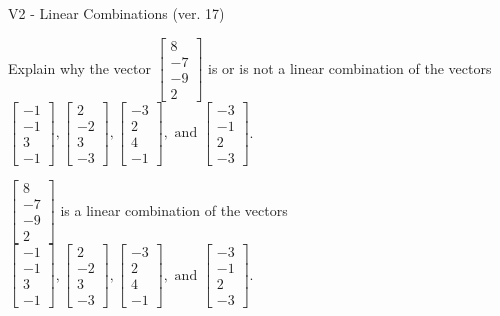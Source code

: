 \begin{exercise}
  \begin{exerciseTitle}V2 - Linear Combinations (ver. 17)\end{exerciseTitle}
  \begin{exerciseStatement}
    Explain why the vector \(\left[\begin{array}{c}
8 \\
-7 \\
-9 \\
2
\end{array}\right]\)  is or is not a linear 
	combination of the vectors \(\left[\begin{array}{c}
-1 \\
-1 \\
3 \\
-1
\end{array}\right] , \left[\begin{array}{c}
2 \\
-2 \\
3 \\
-3
\end{array}\right] , \left[\begin{array}{c}
-3 \\
2 \\
4 \\
-1
\end{array}\right] , \text{ and } \left[\begin{array}{c}
-3 \\
-1 \\
2 \\
-3
\end{array}\right]\).
	


  \end{exerciseStatement}
  \begin{exerciseAnswer}
   \(\left[\begin{array}{c}
8 \\
-7 \\
-9 \\
2
\end{array}\right]\) 
  	 is  
	a linear combination of the vectors \(\left[\begin{array}{c}
-1 \\
-1 \\
3 \\
-1
\end{array}\right] , \left[\begin{array}{c}
2 \\
-2 \\
3 \\
-3
\end{array}\right] , \left[\begin{array}{c}
-3 \\
2 \\
4 \\
-1
\end{array}\right] , \text{ and } \left[\begin{array}{c}
-3 \\
-1 \\
2 \\
-3
\end{array}\right]\).


\end{exerciseAnswer}
\end{exercise}
